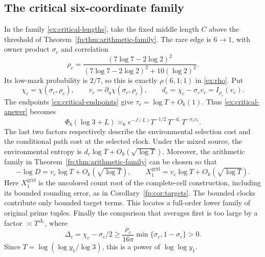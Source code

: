 \subsection{The critical six-coordinate family}
In the family \eqref{ex:critical-lengths}, take the fixed middle
length $C$ above the threshold of Theorem~\ref{fp:thm:arithmetic-family}.
The rare edge is $6\to1$, with owner product $\sigma_c$ and correlation
\[
 \rho_c=\frac{(7\log7-2\log2)^2}
              {(7\log7-2\log2)^2+10(\log2)^2}.
\]
Its low-mark probability is $2/7$, so this is exactly
$\rho(6,1;1)$ in \eqref{ex:rho}. Put
\[
 \chi_c=\chi(\sigma_c,\rho_c),\qquad
 v_c=\partial_\eta\chi(\sigma_c,\rho_c),\qquad
 d_c=\chi_c-\sigma_cv_c=I_{\rho_c}(v_c).
\]
The endpoints \eqref{ex:critical-endpoints} give
$\tau_e=\log T+O_k(1)$. Thus \eqref{ex:critical-answer} becomes
\begin{equation}\label{fp:eq:six-example}
 \Phi_6(\log3+L)
 \asymp_6 e^{-J(L)}T^{-1/2}\,T^{-d_c}\,T^{-\sigma_cv_c}.
\end{equation}
The last two factors respectively describe the environmental selection
cost and the conditional path cost at the selected clock. Under the
mixed source, the environmental entropy is
$d_c\log T+O_k(\sqrt{\log T})$. Moreover, the arithmetic family in
Theorem~\ref{fp:thm:arithmetic-family} can be chosen so that
\begin{equation}\label{fp:eq:six-shell}
 -\log D=v_c\log T+O_k(\sqrt{\log T}),\qquad
 X_1^{\mathrm{grid}}=v_c\log T+O_k(\sqrt{\log T}).
\end{equation}
Here $X_1^{\mathrm{grid}}$ is the uncolored count root of the
complete-cell construction, including its bounded rounding error,
as in Corollary~\ref{fp:cor:targets}. The bounded clocks contribute
only bounded target terms. This locates a full-order lower family
of original prime tuples.
Finally the comparison that averages first is too large by a factor
$\asymp T^{\Delta_c}$, where
\[
 \Delta_c=\chi_c-\sigma_c/2
 \ge\frac{\rho_c}{16\pi}\min\{\sigma_c,1-\sigma_c\}>0.
\]
Since $T=\log(\log y_1/\log3)$, this is a power of $\log\log y_1$.

